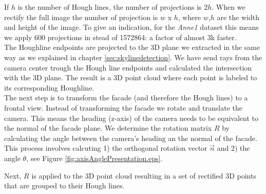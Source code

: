 If $h$ is the number of Hough lines, the number of projections is $2h$.
When we rectify the full image the number of projection is $w$ x $h$, where $w$,$h$ are the width and height of
the image. To give an indication, for the \emph{Anne1} dataset 
this means we apply 600 projections in stead of 1572864: a factor of almost 3k faster.\\

The Houghline endpoints are projected to the 3D plane we extracted in the same
way as we explained in chapter \ref{sec:skylinedetection}. We have send
rays from the camera center trough the Hough line endpoints and calculated the
intersection with the 3D plane.  The result is a 3D point cloud where each
point is labeled to its corresponding Houghline.\\

The next step is to transform the facade (and therefore the Hough lines) to a
frontal view. Instead of transforming the facade we rotate and translate the camera. 
This means the heading (z-axis) of the camera needs to be equivalent to the normal of the facade plane. 
We determine the rotation matrix $R$ by calculating the angle between the camera's heading an the normal of
the facade. This process involves calcuting 1) the orthogonal rotation vector
$\vec{n}$ and 2) the angle $\theta$, see Figure \ref{fig:axisAnglePresentation.eps}.

 
Next, $R$ is applied to the 3D point cloud resulting in a set of rectified 3D
points that are grouped to their Hough lines.



